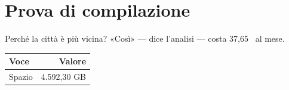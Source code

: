 \documentclass[a4paper,11pt]{article}
\begin{document}
\section{Prova di compilazione}
Perché la città è più vicina? «Così» — dice l’analisi — costa 37,65~\texteuro{} al mese.

\begin{longtable}{lr}
\toprule
Voce & Valore \\
\midrule
Spazio & 4.592,30 GB \\
\bottomrule
\end{longtable}
\end{document}
